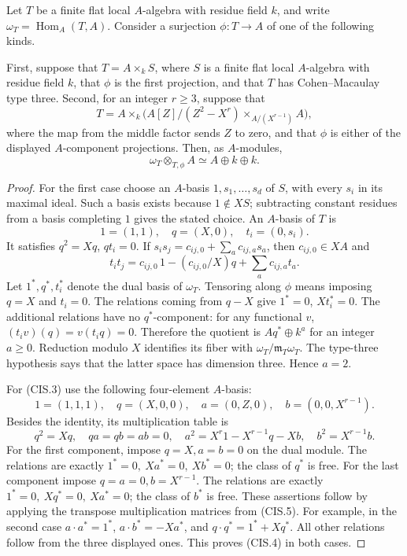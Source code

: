 \begin{lemma}
\label{AC-K29-irregular-algebra}
Let \(T\) be a finite flat local \(A\)-algebra with residue field \(k\),
and write \(\omega_T=\operatorname{Hom}_A(T,A)\).  Consider a
surjection \(\phi:T\to A\) of one of the following kinds.

First, suppose that
\(T=A\times_k S\), where \(S\) is a finite flat local \(A\)-algebra
with residue field \(k\), that \(\phi\) is the first projection, and
that \(T\) has Cohen--Macaulay type three.  Second, for an integer
\(r\geq3\), suppose that
\[
 T=A\times_k\bigl(A[Z]/(Z^2-X^r)
                   \times_{A/(X^{r-1})}A\bigr),        \tag{CIS.3}
\]
where the map from the middle factor sends \(Z\) to zero, and that
\(\phi\) is either of the displayed \(A\)-component projections.
Then, as \(A\)-modules,
\[
 \omega_T\otimes_{T,\phi}A\simeq A\oplus k\oplus k.   \tag{CIS.4}
\]
\end{lemma}

\begin{proof}
For the first case choose an \(A\)-basis \(1,s_1,\ldots,s_d\) of
\(S\), with every \(s_i\) in its maximal ideal.  Such a basis exists
because \(1\notin XS\); subtracting constant residues from a basis
completing \(1\) gives the stated choice.  An \(A\)-basis of \(T\) is
\[
 1=(1,1),\quad q=(X,0),\quad t_i=(0,s_i).
\]
It satisfies \(q^2=Xq\), \(qt_i=0\).  If
\(s_is_j=c_{ij,0}+\sum_a c_{ij,a}s_a\), then
\(c_{ij,0}\in XA\) and
\[
 t_it_j=c_{ij,0}\,1-(c_{ij,0}/X)q+\sum_a c_{ij,a}t_a.
\]
Let \(1^*,q^*,t_i^*\) denote the dual basis of \(\omega_T\).
Tensoring along \(\phi\) means imposing \(q=X\) and \(t_i=0\).
The relations coming from \(q-X\) give
\(1^*=0\), \(Xt_i^*=0\).  The additional relations have no
\(q^*\)-component: for any functional \(v\),
\((t_i v)(q)=v(t_iq)=0\).  Therefore the quotient is
\(Aq^*\oplus k^a\) for an integer \(a\geq0\).  Reduction modulo
\(X\) identifies its fiber with
\(\omega_T/\mathfrak m_T\omega_T\).  The type-three hypothesis says
that the latter space has dimension three.  Hence \(a=2\).

For (CIS.3) use the following four-element \(A\)-basis:
\[
 1=(1,1,1),\quad q=(X,0,0),\quad a=(0,Z,0),
 \quad b=(0,0,X^{r-1}).
\]
Besides the identity, its multiplication table is
\[
 q^2=Xq,\quad qa=qb=ab=0,\quad
 a^2=X^r1-X^{r-1}q-Xb,\quad b^2=X^{r-1}b.             \tag{CIS.5}
\]
For the first component, impose \(q=X,a=b=0\) on the dual module.
The relations are exactly
\(1^*=0,\ Xa^*=0,\ Xb^*=0\); the class of \(q^*\) is free.
For the last component impose \(q=a=0,b=X^{r-1}\).
The relations are exactly
\(1^*=0,\ Xq^*=0,\ Xa^*=0\); the class of \(b^*\) is free.
These assertions follow by applying the transpose multiplication
matrices from (CIS.5).  For example, in the second case
\(a\cdot a^*=1^*\), \(a\cdot b^*=-Xa^*\), and
\(q\cdot q^*=1^*+Xq^*\).  All other relations follow from the three
displayed ones.  This proves (CIS.4) in both cases.
\end{proof}

